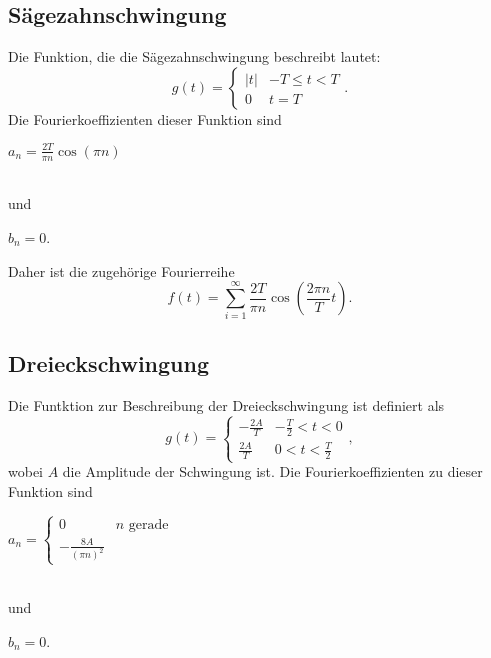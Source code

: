     \subsection{Sägezahnschwingung}
    Die Funktion, die die Sägezahnschwingung beschreibt lautet:
    \begin{equation}
    \label{eqn:saegezahn}
    g(t) = \begin{cases}
            \lvert t \rvert & -T \leq t < T \\
            0 & t = T 
            \end{cases}.
    \end{equation}
    Die Fourierkoeffizienten dieser Funktion sind
    \\ 
    \centerline{$a_n = \frac{2T}{\pi n} \cos(\pi n)$}
    \\
    und 
    \\ 
    \centerline{$b_n = 0$.}
    Daher ist die zugehörige Fourierreihe
    \begin{equation}
    \label{eqn:fouriersäge} 
    f(t) = \sum_{i=1}^{\infty} \frac{2 T}{\pi n} \cos(\frac{ 2 \pi n}{T}t).
    \end{equation}

    \subsection{Dreieckschwingung}
    Die Funtktion zur Beschreibung der Dreieckschwingung ist definiert als
    \begin{equation}
    \label{eqn:dreieck}
    g(t) = \begin{cases} 
            - \frac {2 A} {T} & - \frac {T}{2} < t < 0 \\
            \frac {2 A} {T} & 0 < t < \frac {T}{2}
            \end{cases},
    \end{equation}
    wobei $A$ die Amplitude der Schwingung ist.
    Die Fourierkoeffizienten zu dieser Funktion sind
    \\
    \centerline{$a_n = \begin{cases}
                        0 & n \text{ gerade} \\
                        - \frac{8 A}{(\pi n)^2} \end{cases}$}
                        \\
    und   
    \\         
    \centerline{$b_n = 0$.} 
    \\               


